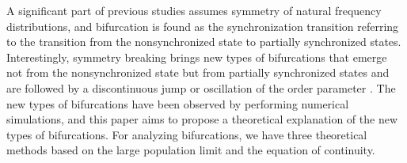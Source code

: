 A significant part of previous studies assumes symmetry
of natural frequency distributions,
and bifurcation
is found as the synchronization transition
  referring to the transition
  from the nonsynchronized state to partially synchronized states.
  Interestingly, symmetry breaking brings new types of bifurcations
  that emerge not from the nonsynchronized state
  but from partially synchronized states
  and are followed by a discontinuous jump or oscillation
  of the order parameter \cite{terada2017}.
The new types of bifurcations have been observed
by performing numerical simulations,
and this paper aims to propose a theoretical explanation
of the new types of bifurcations.
For analyzing bifurcations,
we have three theoretical methods
based on the large population limit
and the equation of continuity.



